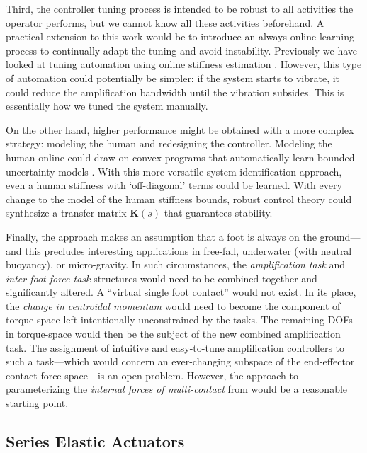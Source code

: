 \documentclass[utf8]{frontiersSCNS}
\renewcommand*{\cite}[1]{\citep{#1}}
\begin{document}
Third, the controller tuning process is intended to be robust to all activities the operator performs, but we cannot know all these activities beforehand.
A practical extension to this work would be to introduce an always-online learning process to continually adapt the tuning and avoid instability.
Previously we have looked at tuning automation using online stiffness estimation \cite{HuangCappelThomasHeSentis2020ACC}.
However, this type of automation could potentially be simpler: if the system starts to vibrate, it could reduce the amplification bandwidth until the vibration subsides.
This is essentially how we tuned the system manually.

On the other hand, higher performance might be obtained with a more complex strategy: modeling the human and redesigning the controller.
Modeling the human online could draw on convex programs that automatically learn bounded-uncertainty models \cite{ThomasSentis2019TAC}. 
With this more versatile system identification approach, even a human stiffness with `off-diagonal' terms could be learned.
With every change to the model of the human stiffness bounds, robust control theory could synthesize a transfer matrix $\mathbf K(s)$ that guarantees stability.


Finally, the approach makes an assumption that a foot is always on the ground---and this precludes interesting applications in free-fall, underwater (with neutral buoyancy), or micro-gravity.
In such circumstances, the \emph{amplification task} and \emph{inter-foot force task} structures would need to be combined together and significantly altered.
A ``virtual single foot contact'' would not exist.
In its place, the \emph{change in centroidal momentum} \cite{KoolenEA2016IJHR} would need to become the component of torque-space left intentionally unconstrained by the tasks.
The remaining DOFs in torque-space would then be the subject of the new combined amplification task.
The assignment of intuitive and easy-to-tune amplification controllers to such a task---which would concern an ever-changing subspace of the end-effector contact force space---is an open problem.
However, the approach to parameterizing the \emph{internal forces of multi-contact} from \cite{SentisParkKhatib2010TRO} would be a reasonable starting point.


\subsection{Series Elastic Actuators}
\end{document}
